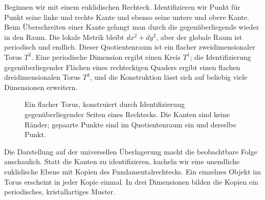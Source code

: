 Beginnen wir mit einem euklidischen Rechteck. Identifizieren wir Punkt für Punkt seine linke und rechte Kante und ebenso seine untere und obere Kante. Beim Überschreiten einer Kante gelangt man durch die gegenüberliegende wieder in den Raum. Die lokale Metrik bleibt \(dx^2+dy^2\), aber der globale Raum ist periodisch und endlich. Dieser Quotientenraum ist ein flacher zweidimensionaler Torus \(T^2\). Eine periodische Dimension ergibt einen Kreis \(T^1\); die Identifizierung gegenüberliegender Flächen eines rechteckigen Quaders ergibt einen flachen dreidimensionalen Torus \(T^3\), und die Konstruktion lässt sich auf beliebig viele Dimensionen erweitern.

\begin{figure}[htbp]\centering
{}\caption{Ein flacher Torus, konstruiert durch Identifizierung gegenüberliegender Seiten eines Rechtecks. Die Kanten sind keine Ränder; gepaarte Punkte sind im Quotientenraum ein und derselbe Punkt.}\label{fig:c03-flat-torus}\end{figure}

\begin{classroomqa}\end{classroomqa}

Die Darstellung auf der universellen Überlagerung macht die beobachtbare Folge anschaulich. Statt die Kanten zu identifizieren, kacheln wir eine unendliche euklidische Ebene mit Kopien des Fundamentalrechtecks. Ein einzelnes Objekt im Torus erscheint in jeder Kopie einmal. In drei Dimensionen bilden die Kopien ein periodisches, kristallartiges Muster.

